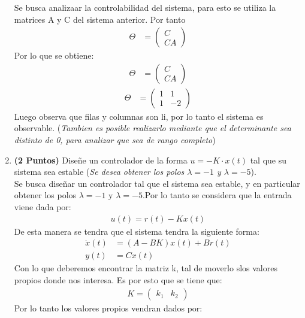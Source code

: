 \begin{enumerate}
    Se busca analizaar la controlabilidad del sistema, para esto se utiliza la matrices A y C del sistema anterior. Por tanto
    \begin{align}
        \Theta &= \begin{pmatrix} C \\ CA \end{pmatrix}
    \end{align}
    Por lo que se obtiene:
    \begin{align}
        \Theta &= \begin{pmatrix} C \\ CA \end{pmatrix}
    \end{align}
    \begin{align}
        \Theta &= \begin{pmatrix} 1 & 1 \\ 1 & -2 \end{pmatrix}
    \end{align}
    Luego observa que filas y columnas son li, por lo tanto el sistema es observable. (\textit{Tambien es posible realizarlo mediante que el determinante sea distinto de 0, para analizar que sea de rango completo})
    \item \textbf{(2 Puntos)} Diseñe un controlador de la forma $u = -K\cdot x(t)$ tal que su sistema sea estable (\textit{Se desea obtener los polos $\lambda= -1$ y $\lambda = -5$}).\\
    Se busca diseñar un controlador tal que el sistema sea estable, y en particular obtener los polos $\lambda= -1$ y $\lambda = -5$.Por lo tanto se considera que la entrada viene dada por:
    \begin{align}
        u(t)= r(t) - Kx(t)
    \end{align}
    De esta manera se tendra que el sistema tendra la siguiente forma:
    \begin{align}
        \dot{x}(t) &= (A-BK)x(t) + Br(t)\\
        y(t) &= Cx(t)
    \end{align}
    Con lo que deberemos encontrar la matriz k, tal de moverlo slos valores propios donde nos interesa. Es por esto que se tiene que:
    \begin{align}
        K=\begin{pmatrix} k_{1} & k_{2} \end{pmatrix}
    \end{align}
    Por lo tanto los valores propios vendran dados por:
    \begin{align}

\end{align}
\end{enumerate}
